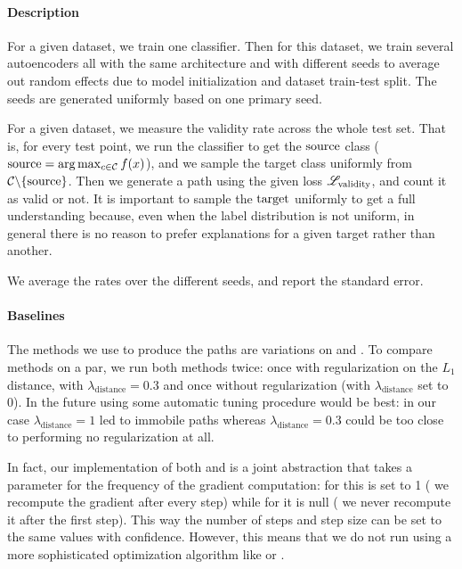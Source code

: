 \documentclass[../main.tex]{subfiles}
\begin{document}
\paragraph{Description}
\label{validity_losses/description}

For a given dataset, we train one classifier.
Then for this dataset, we train several autoencoders all with the same architecture and with different seeds to average out random effects due to model initialization and dataset train-test split.
The seeds are generated uniformly based on one primary seed.

For a given dataset, we measure the validity rate across the whole test set.
That is, for every test point, we run the classifier to get the $\mathrm{source}$ class ($\mathrm{source} = \arg\max_{c \in \mathcal{C}} f(x)$), and we sample the target class uniformly from $\mathcal{C} \backslash \{\mathrm{source}\}$.
Then we generate a path using the given loss $\mathscr{L}_\text{validity}$, and count it as valid or not.
It is important to sample the $\mathrm{target}$ uniformly to get a full understanding because, even when the label distribution is not uniform, in general there is no reason to prefer explanations for a given target rather than another.

We average the rates over the different seeds, and report the standard error.

\paragraph{Baselines}

The methods we use to produce the paths are variations on \ls{} and \revise{}.
To compare methods on a par, we run both methods twice: once with regularization on the $L_1$ distance, with $\lambda_\text{distance} = 0.3$ and once without regularization (with $\lambda_\text{distance}$ set to 0).
In the future using some automatic tuning procedure would be best: in our case $\lambda_\text{distance} = 1$ led to immobile paths whereas $\lambda_\text{distance} = 0.3$ could be too close to performing no regularization at all.

In fact, our implementation of both \ls{} and \revise{} is a joint abstraction that takes a parameter for the frequency of the gradient computation: for \revise{} this is set to 1 (\ie{} we recompute the gradient after every step) while for \ls{} it is null (\ie{} we never recompute it after the first step).
This way the number of steps and step size can be set to the same values with confidence.
However, this means that we do not run \revise{} using a more sophisticated optimization algorithm like  or .
\end{document}
